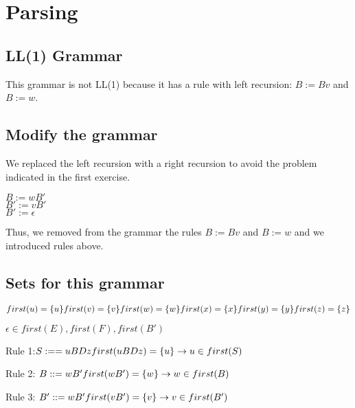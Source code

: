 \label{parsing}
\section{Parsing}
\subsection{LL(1) Grammar}
 This grammar is not LL(1) because it has a rule with left recursion: $B:=Bv$ and $B:=w$.\\
\subsection{Modify the grammar}
We replaced the left recursion with a right recursion to avoid the problem indicated in the first exercise.
\begin{center}            
	$B:=wB'$\\
        $B':=vB'$\\
        $B':=\epsilon$\\
\end{center}
Thus, we removed from the grammar the rules $B:=Bv$ and $B:=w$ and we introduced rules above.\\
\subsection{Sets for this grammar}
$first(u) = \{u\}\\
            first(v) = \{v\}\\
            first(w) = \{w\}\\
            first(x) = \{x\}\\
            first(y) = \{y\}\\
            first(z) = \{z\}$
                
            $\epsilon \in first(E), first(F), first(B')$

            Rule 1:$ S:== uBDz\\
            first(uBDz) = \{u\}\\
            \rightarrow u \in first(S)$
            
            Rule 2: $B::=wB'\\
            first(wB')=\{w\}\\
            \rightarrow w\in first(B)$
            
            Rule 3: $B'::= wB'\\
            first(vB') = \{v\}\\
            \rightarrow v \in first(B')$
            
